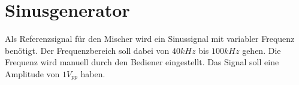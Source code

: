 \section{Sinusgenerator}
Als Referenzsignal für den Mischer wird ein Sinussignal mit variabler 
Frequenz benötigt. 
Der Frequenzbereich soll dabei von $40 kHz$ bis $100 kHz$ gehen. Die Frequenz 
wird manuell durch den Bediener eingestellt. 
Das Signal soll eine Amplitude von $1 V_{pp}$ haben. 

